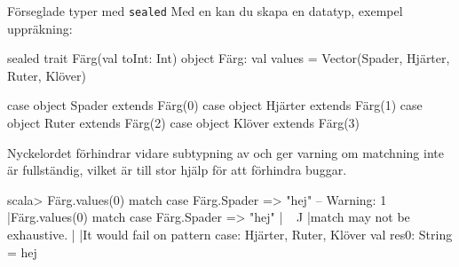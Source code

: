 


\begin{Slide}{Förseglade typer med \texttt{sealed}}\SlideFontSmall
Med en  kan du skapa en  datatyp, exempel uppräkning:
\begin{Code}
sealed trait Färg(val toInt: Int)
object Färg:
  val values = Vector(Spader, Hjärter, Ruter, Klöver)

  case object Spader  extends Färg(0)
  case object Hjärter extends Färg(1)
  case object Ruter   extends Färg(2)
  case object Klöver  extends Färg(3)
\end{Code}
Nyckelordet  förhindrar vidare subtypning av  och ger varning om matchning inte är fullständig, vilket är till stor hjälp för att förhindra buggar.

\begin{REPL}
scala> Färg.values(0) match { case Färg.Spader => "hej" }
-- Warning:
1 |Färg.values(0) match { case Färg.Spader => "hej" }
     |^^^^^^^^^^^^^^
     |match may not be exhaustive.
     |
     |It would fail on pattern case: Hjärter, Ruter, Klöver
val res0: String = hej
\end{REPL}
\end{Slide}





